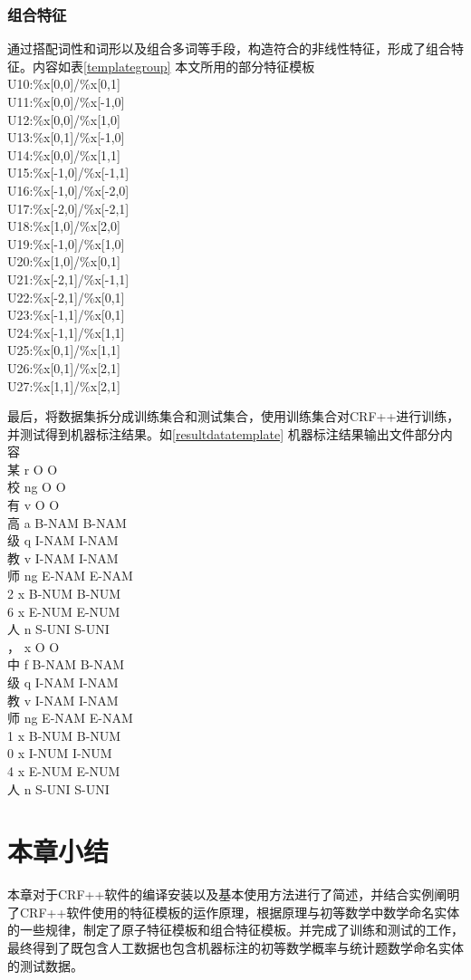 \subsubsection{组合特征}
通过搭配词性和词形以及组合多词等手段，构造符合的非线性特征，形成了组合特征。内容如表\ref{templategroup}
{本文所用的部分特征模板\\}
{
U10:\%x[0,0]/\%x[0,1]\\
U11:\%x[0,0]/\%x[-1,0]\\
U12:\%x[0,0]/\%x[1,0]\\
U13:\%x[0,1]/\%x[-1,0]\\
U14:\%x[0,0]/\%x[1,1]\\
U15:\%x[-1,0]/\%x[-1,1]\\
U16:\%x[-1,0]/\%x[-2,0]\\
U17:\%x[-2,0]/\%x[-2,1]\\
U18:\%x[1,0]/\%x[2,0]\\
U19:\%x[-1,0]/\%x[1,0]\\
U20:\%x[1,0]/\%x[0,1]\\
U21:\%x[-2,1]/\%x[-1,1]\\
U22:\%x[-2,1]/\%x[0,1]\\
U23:\%x[-1,1]/\%x[0,1]\\
U24:\%x[-1,1]/\%x[1,1]\\
U25:\%x[0,1]/\%x[1,1]\\
U26:\%x[0,1]/\%x[2,1]\\
U27:\%x[1,1]/\%x[2,1]\\
}
{
}

最后，将数据集拆分成训练集合和测试集合，使用训练集合对CRF++进行训练，并测试得到机器标注结果。如\ref{resultdatatemplate}
{机器标注结果输出文件部分内容\\}
{
某	r	O	O\\
校	ng	O	O\\
有	v	O	O\\
高	a	B-NAM	B-NAM\\
级	q	I-NAM	I-NAM\\
教	v	I-NAM	I-NAM\\
师	ng	E-NAM	E-NAM\\
2	x	B-NUM	B-NUM\\
6	x	E-NUM	E-NUM\\
人	n	S-UNI	S-UNI\\
，	x	O	O\\
中	f	B-NAM	B-NAM\\
级	q	I-NAM	I-NAM\\
教	v	I-NAM	I-NAM\\
师	ng	E-NAM	E-NAM\\
1	x	B-NUM	B-NUM\\
0	x	I-NUM	I-NUM\\
4	x	E-NUM	E-NUM\\
人	n	S-UNI	S-UNI\\
}
{
}

\section{本章小结}

本章对于CRF++软件的编译安装以及基本使用方法进行了简述，并结合实例阐明了CRF++软件使用的特征模板的运作原理，根据原理与初等数学中数学命名实体的一些规律，制定了原子特征模板和组合特征模板。并完成了训练和测试的工作，最终得到了既包含人工数据也包含机器标注的初等数学概率与统计题数学命名实体的测试数据。
